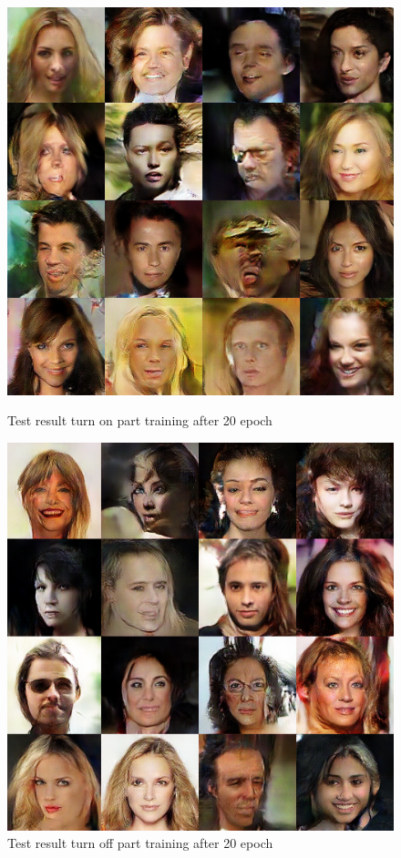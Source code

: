 \begin{figure}
    \begin{minipage}[t]{0.48\linewidth}
        \centering
        \includegraphics[width=\textwidth]{figures/result_part_off.png}
        \caption{Test result turn on part training after 20 epoch}
        \label{part_off}
    \end{minipage}
        \hfill
    \begin{minipage}[t]{0.48\linewidth}
        \centering
        \includegraphics[width=\textwidth]{figures/result_part_on.png}
        \caption{Test result turn off part training after 20 epoch}
        \label{part_on}
    \end{minipage}
\end{figure}

